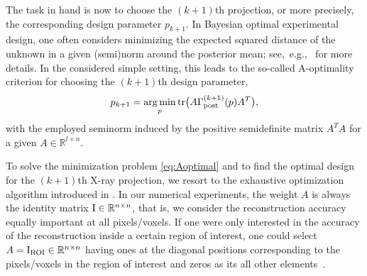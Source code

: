 \documentclass[final]{siamltex}
\newcommand{\R}{\mathbb{R}}
\DeclareMathOperator{\argmin}{\rm arg\, min}
\begin{document}
The task in hand is now to choose the $(k+1)$th projection, or more precisely, the corresponding design parameter $p_{k+1}$. In Bayesian optimal experimental design, one often considers minimizing the expected squared distance of the unknown in a given (semi)norm around the posterior mean; see,~e.g.,~\cite{alexanderian2016bayesian,chaloner1995bayesian} for more details. In the considered simple setting, this leads to the so-called A-optimality criterion for choosing the $(k+1)$th design parameter,
\begin{equation}
\label{eq:Aoptimal}
p_{k+1} =  \underset{p}{\argmin} \, {\rm tr}  \big(A \Gamma_{\rm post}^{(k+1)}(p) A^T\big),
\end{equation}
with the employed seminorm induced by the positive semidefinite matrix $A^T \!A$ for a given $A \in \R^{l \times n}$.

To solve the minimization problem \eqref{eq:Aoptimal} and to find the optimal design for the $(k+1)$th X-ray projection, we resort to the exhaustive optimization algorithm introduced in \cite{Burger21}. In our numerical experiments, the weight $A$ is always the identity matrix ${\rm I} \in \R^{n \times n}$, that is, we consider the reconstruction accuracy equally important at all pixels/voxels. If one were only interested in the accuracy of the reconstruction inside a certain
region of interest, one could select $A = {\rm I}_{\rm ROI} \in  \R^{n \times n}$ having ones at the diagonal positions corresponding to the pixels/voxels in the
region of interest and zeros as its all other elements~\cite{Burger21}.
\end{document}
